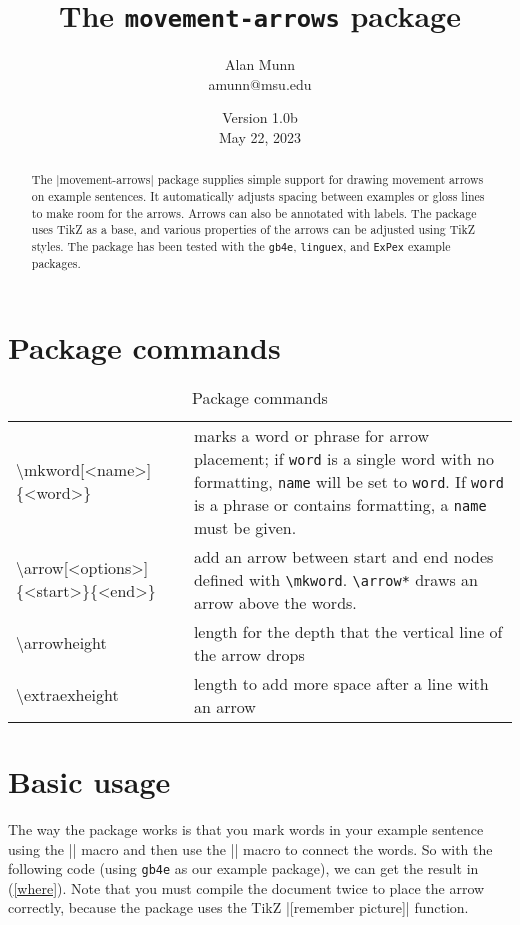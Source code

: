 \documentclass[11pt]{article}
\title{The \texttt{movement-arrows} package}
\author{Alan Munn\\amunn@msu.edu}
\date{Version 1.0b\\May 22, 2023}
\newcommand*{\pkg}[1]{\texttt{#1}}
\newcommand*{\bs}{\textbackslash}
\begin{document}
\maketitle
\thispagestyle{empty}
\begin{abstract}{\noindent
The |movement-arrows| package supplies simple support for drawing movement arrows on example sentences. It automatically adjusts spacing between examples or gloss lines to make room for the arrows.  Arrows can also be annotated with labels.  The package uses TikZ as a base, and various properties of the arrows can be adjusted using TikZ styles. The package has been tested with the \pkg{gb4e}, \pkg{linguex}, and \pkg{ExPex} example packages.


}
\end{abstract}
\section{Package commands}
\begin{table}[htpb]
\centering
\begin{tabularx}{.9\textwidth}{t{l}X}
\toprule
\bs mkword[<name>]\{<word>\} & marks a word or phrase for arrow placement; if \pkg{word} is a single word with no formatting, \pkg{name} will be set to \pkg{word}. If \pkg{word} is a phrase or contains formatting, a \pkg{name} must be given.\\
\bs arrow[<options>]\{<start>\}\{<end>\} & add an arrow between start and end nodes defined with \pkg{\bs mkword}. \pkg{\bs arrow*} draws an arrow above the words.\\
\bs arrowheight & length for the depth that the vertical line of the arrow drops\\
\bs extraexheight & length to add more space after a line with an arrow\\
\bottomrule
\end{tabularx}
\caption{Package commands}
\end{table}
\section{Basic usage}
The way the package works is that you mark words in your example sentence using the |\mkword| macro and then use the |\arrow| macro to connect the words. So with the following code (using \pkg{gb4e} as our example package), we can get the result in (\ref{where}).  Note that you must compile the document twice to place the arrow correctly, because the package uses the TikZ |[remember picture]| function.
\end{document}
